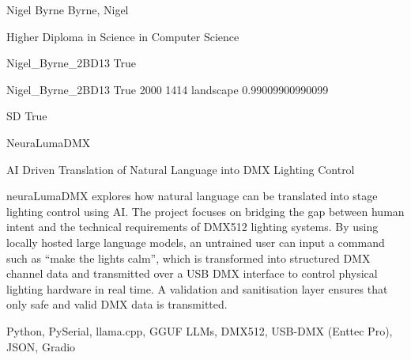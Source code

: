 
\begingroup{}\relax



\def\Key{Nigel_Byrne_2BD13}

{Nigel Byrne}
{Byrne, Nigel}

{Higher Diploma in Science in Computer Science}

{Nigel_Byrne_2BD13}
{True}

{Nigel_Byrne_2BD13}
{True}
{2000}
{1414}
{landscape}
{0.99009900990099}

{SD}
{True}

{NeuraLumaDMX}

{AI Driven Translation of Natural Language into DMX Lighting Control}

{neuraLumaDMX explores how natural language can be translated into stage lighting control using AI. The project focuses on bridging the gap between human intent and the technical requirements of DMX512 lighting systems. By using locally hosted large language models, an untrained user can input a command such as “make the lights calm”, which is transformed into structured DMX channel data and transmitted over a USB DMX interface to control physical lighting hardware in real time. A validation and sanitisation layer ensures that only safe and valid DMX data is transmitted.}

{Python, PySerial, llama.cpp, GGUF LLMs, DMX512, USB-DMX (Enttec Pro), JSON, Gradio}

